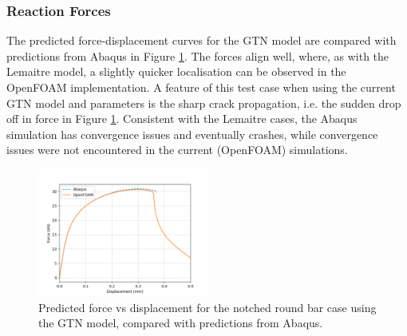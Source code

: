\documentclass[sn-mathphys,Numbered]{sn-jnl}%
\begin{document}

\subsubsection{Reaction Forces}
The predicted force-displacement curves for the GTN model are compared with predictions from Abaqus in Figure \ref{fig:axi_GTN_forceDisp}.
The forces align well, where, as with the Lemaitre model, a slightly quicker localisation can be observed in the OpenFOAM implementation.
A feature of this test case when using the current GTN model and parameters is the sharp crack propagation, i.e. the sudden drop off in force in Figure \ref{fig:axi_GTN_forceDisp}.
Consistent with the Lemaitre cases, the Abaqus simulation has convergence issues and eventually crashes, while convergence issues were not encountered in the current (OpenFOAM) simulations.
\begin{figure}[htb]
\begin{center}
	\includegraphics[width=0.5\textwidth]{./Figures/GTNCompare/forceDispGTN.jpg}
	\caption{Predicted force vs displacement for the notched round bar case using the GTN model, compared with predictions from Abaqus.}
	\label{fig:axi_GTN_forceDisp}
\end{center}
\end{figure}

\end{document}
